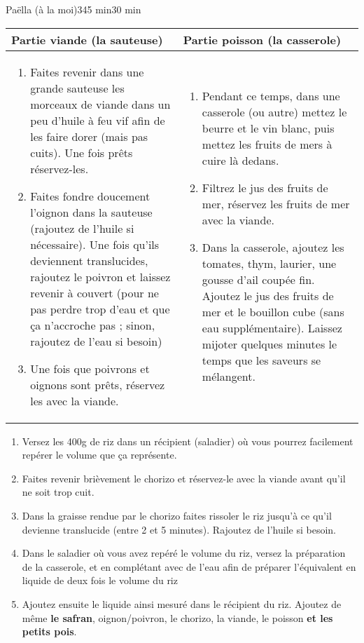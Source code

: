 \begin{recette}{Paëlla (à la moi)}{3}{45 min}{30 min}
\begin{preparation*}
\begin{tabular}{p{}|p{}}
Partie viande (la sauteuse)& Partie poisson (la casserole)\\\hline
\begin{enumerate}
\item Faites revenir dans une grande sauteuse les morceaux de viande dans un peu d'huile à feu vif afin de les faire dorer (mais pas cuits). Une fois prêts réservez-les.
\item Faites fondre doucement l'oignon dans la sauteuse (rajoutez de l'huile si nécessaire). Une fois qu'ils deviennent translucides, rajoutez le poivron et laissez revenir à couvert (pour ne pas perdre trop d'eau et que ça n'accroche pas ; sinon, rajoutez de l'eau si besoin)
\item Une fois que poivrons et oignons sont prêts, réservez les avec la viande.
\end{enumerate}&\begin{enumerate}
\item Pendant ce temps, dans une casserole (ou autre) mettez le beurre et le vin blanc, puis mettez les fruits de mers à cuire là dedans.
\item Filtrez le jus des fruits de mer, réservez les fruits de mer avec la viande. 
\item Dans la casserole, ajoutez les tomates, thym, laurier, une gousse d'ail coupée fin. Ajoutez le jus des fruits de mer et le bouillon cube (sans eau supplémentaire). Laissez mijoter quelques minutes le temps que les saveurs se mélangent.
\end{enumerate}
\end{tabular}
\begin{enumerate}
\item Versez les 400g de riz dans un récipient (saladier) où vous pourrez facilement repérer le volume que ça représente. 
\item Faites revenir brièvement le chorizo et réservez-le avec la viande avant qu'il ne soit trop cuit. 
\item Dans la graisse rendue par le chorizo faites rissoler le riz jusqu'à ce qu'il devienne translucide (entre 2 et 5 minutes). Rajoutez de l'huile si besoin.
\item Dans le saladier où vous avez repéré le volume du riz, versez la préparation de la casserole, et en complétant avec de l'eau afin de préparer l'équivalent en liquide de deux fois le volume du riz
\item Ajoutez ensuite le liquide ainsi mesuré dans le récipient du riz. Ajoutez de même \textbf{le safran}, oignon/poivron, le chorizo, la viande, le poisson \textbf{et les petits pois}.
\end{enumerate}
\end{preparation*}


\end{recette}

